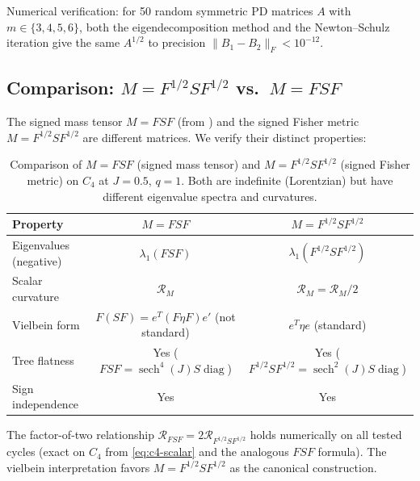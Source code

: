 \documentclass[11pt]{article}
\theoremstyle{definition}
\theoremstyle{remark}
\newcommand{\Fish}{F}
\newcommand{\sgn}{S}
\newcommand{\Met}{M}
\newcommand{\diag}{\operatorname{diag}}
\newcommand{\sech}{\operatorname{sech}}
\newcommand{\Scal}{\mathcal{R}}
\begin{document}
\noindent Numerical verification: for 50 random symmetric PD matrices $A$
with $m \in \{3, 4, 5, 6\}$, both the eigendecomposition method and
the Newton--Schulz iteration give the same $A^{1/2}$ to precision
$\|B_1 - B_2\|_F < 10^{-12}$.

\subsection{Comparison: $\Met = F^{1/2}SF^{1/2}$ vs.\ $M = FSF$}

The signed mass tensor $M = FSF$ (from \cite{Paper1}) and the signed
Fisher metric $\Met = F^{1/2}SF^{1/2}$ are different matrices. We
verify their distinct properties:

\begin{table}[ht]
\centering
\caption{Comparison of $M = FSF$ (signed mass tensor) and
$\Met = \Fish^{1/2}\sgn\Fish^{1/2}$ (signed Fisher metric) on $C_4$
at $J = 0.5$, $q = 1$. Both are indefinite (Lorentzian) but have
different eigenvalue spectra and curvatures.}
\label{tab:m-vs-metric}
\renewcommand{\arraystretch}{1.3}
\begin{tabular}{lcc}
\toprule
Property & $M = FSF$ & $\Met = F^{1/2}SF^{1/2}$ \\
\midrule
Eigenvalues (negative) & $\lambda_1(FSF)$ & $\lambda_1(F^{1/2}SF^{1/2})$ \\
Scalar curvature & $\Scal_M$ & $\Scal_{\Met} = \Scal_M/2$ \\
Vielbein form & $F(SF) = e^T (F\eta F) e'$ (not standard) & $e^T \eta e$ (standard) \\
Tree flatness & Yes ($FSF = \sech^4(J) S \diag$) & Yes ($F^{1/2}SF^{1/2} = \sech^2(J) S \diag$) \\
Sign independence & Yes & Yes \\
\bottomrule
\end{tabular}
\end{table}

The factor-of-two relationship $\Scal_{FSF} = 2\Scal_{F^{1/2}SF^{1/2}}$
holds numerically on all tested cycles (exact on $C_4$ from
\eqref{eq:c4-scalar} and the analogous $FSF$ formula). The vielbein
interpretation favors $\Met = F^{1/2}SF^{1/2}$ as the canonical
construction.
\end{document}
